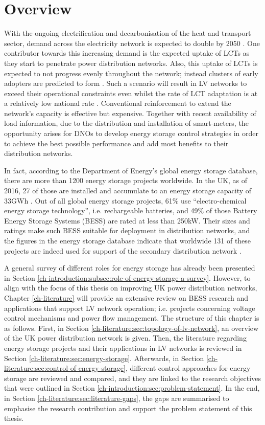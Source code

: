 \section{Overview}
\label{ch-literature:sec:overview}

With the ongoing electrification and decarbonisation of the heat and transport sector, demand across the electricity network is expected to double by 2050 \cite{Wilks2010}.
One contributor towards this increasing demand is the expected uptake of LCTs as they start to penetrate power distribution networks.
Also, this uptake of LCTs is expected to not progress evenly throughout the network; instead clusters of early adopters are predicted to form \cite{Poghosyan2014}.
Such a scenario will result in LV networks to exceed their operational constraints even whilst the rate of LCT adaptation is at a relatively low national rate \cite{Poghosyan2014}.
Conventional reinforcement to extend the network's capacity is effective but expensive.
Together with recent availability of load information, due to the distribution and installation of smart-meters, the opportunity arises for DNOs to develop energy storage control strategies in order to achieve the best possible performance and add most benefits to their distribution networks.

In fact, according to the Department of Energy's global energy storage database, there are more than 1200 energy storage projects worldwide.
In the UK, as of 2016, 27 of those are installed and accumulate to an energy storage capacity of 33GWh \cite{Garton2016}.
Out of all global energy storage projects, 61\% use ``electro-chemical energy storage technology'', i.e. rechargeable batteries, and 49\% of those Battery Energy Storage Systems (BESS) are rated at less than 250kW.
Their sizes and ratings make such BESS suitable for deployment in distribution networks, and the figures in the energy storage database indicate that worldwide 131 of these projects are indeed used for support of the secondary distribution network \cite{DOE-GESD}.

A general survey of different roles for energy storage has already been presented in Section \ref{ch-introduction:subsec:role-of-energy-storage-a-survey}.
However, to align with the focus of this thesis on improving UK power distribution networks, Chapter \ref{ch-literature} will provide an extensive review on BESS research and applications that support LV network operation; i.e. projects concerning voltage control mechanisms and power flow management.
The structure of this chapter is as follows.
First, in Section \ref{ch-literature:sec:topology-of-lv-network}, an overview of the UK power distribution network is given.
Then, the literature regarding energy storage projects and their applications in LV networks is reviewed in Section \ref{ch-literature:sec:energy-storage}.
Afterwards, in Section \ref{ch-literature:sec:control-of-energy-storage}, different control approaches for energy storage are reviewed and compared, and they are linked to the research objectives that were outlined in Section \ref{ch-introduction:sec:problem-statement}.
In the end, in Section \ref{ch-literature:sec:literature-gaps}, the gaps are summarised to emphasise the research contribution and support the problem statement of this thesis.
